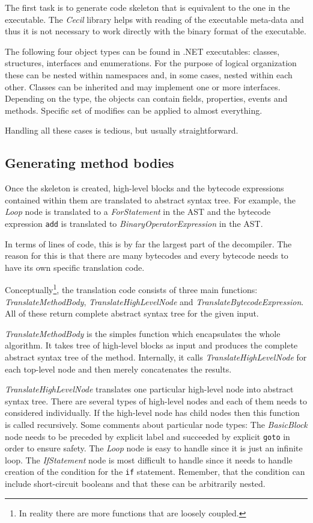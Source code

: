 \documentclass[12pt,twoside,notitlepage]{report}
\begin{document}
The first task is to generate code skeleton that is
equivalent to the one in the executable.
The \emph{Cecil} library helps with reading of the executable
meta-data and thus it is not necessary to work directly with
the binary format of the executable.

The following four object types can be found in .NET executables:
classes, structures, interfaces and enumerations.
For the purpose of logical organization these can be nested 
within namespaces and, in some cases, nested within each other.
Classes can be inherited and may implement one or more interfaces.
Depending on the type, the objects can contain fields,
properties, events and methods.
Specific set of modifies can be applied to almost everything.

Handling all these cases is tedious, but usually straightforward.

\subsection{Generating method bodies}
     \label{Generating method bodies}

Once the skeleton is created, high-level blocks and the bytecode
expressions contained within them are translated to 
abstract syntax tree.  For example, the \emph{Loop} node is translated 
to a \emph{ForStatement} in the AST and the bytecode expression \verb|add|
is translated to \emph{BinaryOperatorExpression} in the AST.

In terms of lines of code, this is by far the largest part of the
decompiler.  The reason for this is that there are many bytecodes
and every bytecode needs to have its own specific translation code.

Conceptually\footnote{In reality there are more functions 
that are loosely coupled.},
the translation code consists of three main functions:
\emph{TranslateMethodBody}, \emph{TranslateHighLevelNode} and
\emph{TranslateBytecodeExpression}.
All of these return complete abstract syntax tree for the given input.

\emph{TranslateMethodBody} is the simples function which encapsulates
the whole algorithm.  It takes tree of high-level blocks as input and 
produces the complete abstract syntax tree of the method.
Internally, it calls \emph{TranslateHighLevelNode} for each top-level
node and then merely concatenates the results.

\emph{TranslateHighLevelNode} translates one particular high-level 
node into abstract syntax tree.  There are several types of high-level
nodes and each of them needs to considered individually.
If the high-level node has child nodes then this function is
called recursively.  Some comments about particular node types:
The \emph{BasicBlock} node needs to be preceded by explicit label
and succeeded by explicit \verb|goto| in order to ensure safety.
The \emph{Loop} node is easy to handle since it is just an infinite loop.
The \emph{IfStatement} node is most difficult to handle since it
needs to handle creation of the condition for the \verb|if| statement.
Remember, that the condition can include short-circuit booleans and
that these can be arbitrarily nested.
\end{document}

